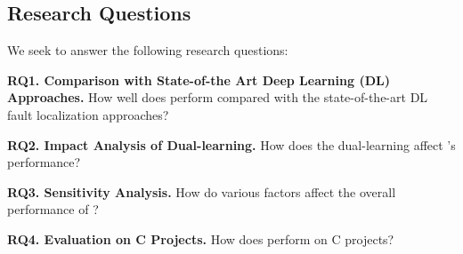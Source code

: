 \subsection{Research Questions}

We seek to answer the following research questions:

\noindent\textbf{RQ1. Comparison with State-of-the Art Deep Learning (DL)
  Approaches.}  How well does {\tool} perform compared with the
state-of-the-art DL fault localization approaches?

\noindent\textbf{RQ2. Impact Analysis of Dual-learning.} 
How does the dual-learning affect {\tool}'s performance?

\noindent\textbf{RQ3. Sensitivity Analysis.} How do various factors affect the overall performance of {\tool}?


\noindent\textbf{RQ4. Evaluation on C Projects.} How does {\tool} perform on C projects?
